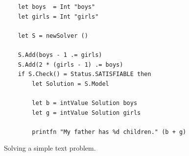 \begin{figure}[!ht]
\centering
\begin{verbatim}             
    let boys  = Int "boys"
    let girls = Int "girls"

    let S = newSolver ()

    S.Add(boys - 1 .= girls)
    S.Add(2 * (girls - 1) .= boys)
    if S.Check() = Status.SATISFIABLE then
        let Solution = S.Model

        let b = intValue Solution boys
        let g = intValue Solution girls

        printfn "My father has %d children." (b + g)
\end{verbatim}
\vspace*{-0.3cm}
\caption{Solving a simple text problem.}
\label{fig:Brothers-and-Sisters.ipynb}
\end{figure}

